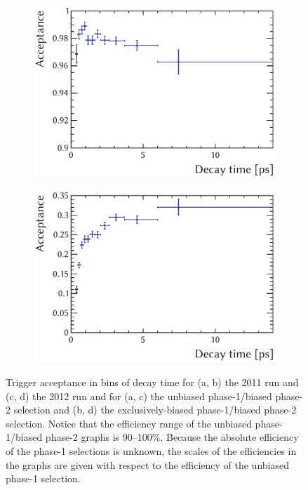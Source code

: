 \begin{figure}[htbp]
  \vspace*{0.02\textwidth}
  \begin{subfigure}{0.49\textwidth}
    \includegraphics[width=\textwidth]{graphics/analysis/trigTimeAcc_2012_UB}
    \caption{}
    \label{fig:trigAcc_2012_UB}
  \end{subfigure}%
  \hfill%
  \begin{subfigure}{0.49\textwidth}
    \includegraphics[width=\textwidth]{graphics/analysis/trigTimeAcc_2012_exclB}
    \caption{}
    \label{fig:trigAcc_2012_exclB}
  \end{subfigure}
  \caption{Trigger acceptance in bins of decay time for (a, b) the 2011 run and (c, d) the 2012 run
           and for (a, c) the unbiased phase-1/biased phase-2 selection and (b, d) the exclusively-biased phase-1/biased phase-2 selection.
           Notice that the efficiency range of the unbiased phase-1/biased phase-2 graphs is 90--100\%.
           Because the absolute efficiency of the phase-1 selections is unknown, the scales of the efficiencies
           in the graphs are given with respect to the efficiency of the unbiased phase-1 selection.}
  \label{fig:trigAcc}
\end{figure}

